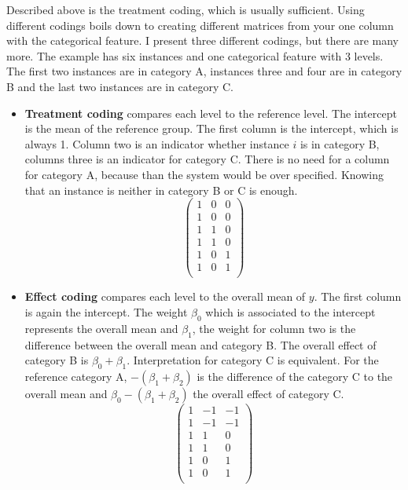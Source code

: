 \documentclass[12pt,]{krantz}
\providecommand{\tightlist}{%
  \setlength{\itemsep}{0pt}\setlength{\parskip}{0pt}}
\theoremstyle{definition}
\theoremstyle{definition}
\theoremstyle{definition}
\theoremstyle{remark}
\begin{document}
Described above is the treatment coding, which is usually sufficient.
Using different codings boils down to creating different matrices from
your one column with the categorical feature. I present three different
codings, but there are many more. The example has six instances and one
categorical feature with 3 levels. The first two instances are in
category A, instances three and four are in category B and the last two
instances are in category C.

\begin{itemize}
\tightlist
\item
  \textbf{Treatment coding} compares each level to the reference level.
  The intercept is the mean of the reference group. The first column is
  the intercept, which is always 1. Column two is an indicator whether
  instance \(i\) is in category B, columns three is an indicator for
  category C. There is no need for a column for category A, because than
  the system would be over specified. Knowing that an instance is
  neither in category B or C is enough. \[
  \begin{pmatrix}
  1 & 0 & 0 \\
  1 & 0 & 0 \\
  1 & 1 & 0 \\
  1 & 1 & 0 \\
  1 & 0 & 1 \\
  1 & 0 & 1 \\
  \end{pmatrix}
  \]
\item
  \textbf{Effect coding} compares each level to the overall mean of
  \(y\). The first column is again the intercept. The weight
  \(\beta_{0}\) which is associated to the intercept represents the
  overall mean and \(\beta_{1}\), the weight for column two is the
  difference between the overall mean and category B. The overall effect
  of category B is \(\beta_{0} + \beta_{1}\). Interpretation for
  category C is equivalent. For the reference category A,
  \(-(\beta_{1} + \beta_{2})\) is the difference of the category C to
  the overall mean and \(\beta_{0} -(\beta_{1} + \beta_{2})\) the
  overall effect of category C. \[
  \begin{pmatrix}
  1 & -1 & -1 \\
  1 & -1 & -1 \\
  1 & 1 & 0 \\
  1 & 1 & 0 \\
  1 & 0 & 1 \\
  1 & 0 & 1 \\
  \end{pmatrix}
\]
\end{itemize}
\end{document}
